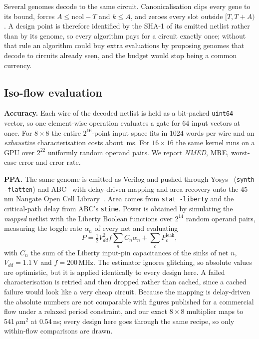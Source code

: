 \documentclass[acmsmall,review,anonymous]{acmart}
\newcommand{\nmed}{\textit{NMED}}
\begin{document}
Several genomes decode to the same circuit.  Canonicalisation clips every gene
to its bound, forces $A\le\mathrm{ncol}-T$ and $k\le A$, and zeroes every slot
outside $[T,T+A)$.  A design point is therefore identified by the SHA-1 of its
emitted netlist rather than by its genome, so every algorithm pays for a
circuit exactly once; without that rule an algorithm could buy extra
evaluations by proposing genomes that decode to circuits already seen, and the
budget would stop being a common currency.

\subsection{Iso-flow evaluation}
\label{sec:eval}
\textbf{Accuracy.}  Each wire of the decoded netlist is held as a bit-packed
\texttt{uint64} vector, so one element-wise operation evaluates a gate for 64
input vectors at once.  For $8\times8$ the entire $2^{16}$-point input space
fits in 1024 words per wire and an \emph{exhaustive} characterisation costs
about \MsEight\,ms.  For $16\times16$ the same kernel runs on a GPU over
$2^{22}$ uniformly random operand pairs.  We report \nmed{}, MRE, worst-case
error and error rate.

\textbf{PPA.}  The same genome is emitted as Verilog and pushed through
Yosys~\cite{yosys} (\texttt{synth -flatten}) and ABC~\cite{abc} with
delay-driven mapping and area recovery onto the 45\,nm Nangate Open Cell
Library~\cite{nangate}.  Area comes from \texttt{stat -liberty} and the
critical-path delay from ABC's \texttt{stime}.  Power is obtained by simulating
the \emph{mapped} netlist with the Liberty Boolean functions over $2^{14}$
random operand pairs, measuring the toggle rate $\alpha_n$ of every net and
evaluating
\begin{equation}
P=\tfrac12 V_{dd}^{2} f \sum_{n} C_n\alpha_n + \sum_{c} P^{\mathrm{leak}}_c ,
\end{equation}
with $C_n$ the sum of the Liberty input-pin capacitances of the sinks of net
$n$, $V_{dd}=1.1$\,V and $f=200$\,MHz.  The estimator ignores glitching, so
absolute values are optimistic, but it is applied identically to every design
here.  A failed characterisation is retried and then dropped rather than
cached, since a cached failure would look like a very cheap circuit.  Because
the mapping is delay-driven the absolute numbers are not comparable with
figures published for a commercial flow under a relaxed period constraint, and
our exact $8\times8$ multiplier maps to 541\,$\mu$m$^2$ at 0.54\,ns; every
design here goes through the same recipe, so only within-flow comparisons are
drawn.
\end{document}
